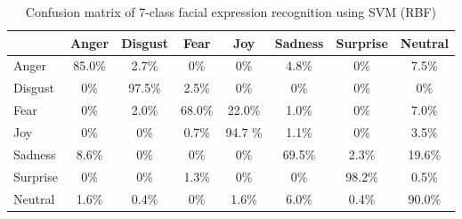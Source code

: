 \begin{table}[h]
\begin{tabular}{|lccccccc|}
\hline
& Anger & Disgust & Fear & Joy & Sadness & Surprise & Neutral \\
\hline
Anger & 85.0\% & 2.7\% & 0\% & 0\% & 4.8\% & 0\% & 7.5\% \\
Disgust & 0\% & 97.5\% & 2.5\% & 0\% & 0\% & 0\% & 0\% \\
Fear & 0\% & 2.0\% & 68.0\% & 22.0\% & 1.0\% & 0\% & 7.0\% \\
Joy & 0\% & 0\% & 0.7\% & 94.7 \% & 1.1\% & 0\% & 3.5\% \\
Sadness & 8.6\% & 0\% & 0\% & 0\% & 69.5\% & 2.3\% & 19.6\% \\
Surprise & 0\% & 0\% & 1.3\% & 0\% & 0\% & 98.2\% & 0.5\% \\
Neutral & 1.6\% & 0.4\% & 0\% & 1.6\% & 6.0\% & 0.4\% & 90.0\% \\
\hline
\end{tabular}
\caption{\label{conf_mtx_7_svm_lbp} Confusion matrix of 7-class facial expression recognition using SVM (RBF)}
\end{table}
\clearpage
